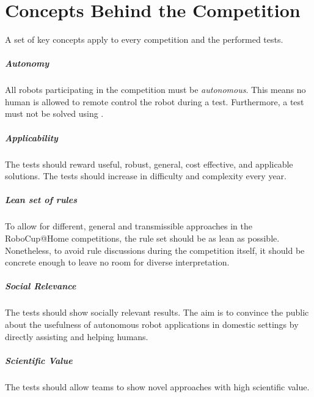 \chapter{Concepts Behind the Competition}
\label{chap:concepts}
A set of key concepts apply to every \RoboCup\AtHome{} competition and the performed tests.

\paragraph{Autonomy}
\label{sec:concepts:autonomy}
All robots participating in the \RoboCup\AtHome{} competition must be \emph{autonomous}. This means no human is allowed to remote control the robot during a test. Furthermore, a test must not be solved using \OLC{}.

\paragraph{Applicability}
\label{sec:concepts:applicability}
The tests should reward useful, robust, general, cost effective, and applicable solutions. The tests should increase in difficulty and complexity every year.

\paragraph{Lean set of rules}
\label{sec:concepts:leanrules}
To allow for different, general and transmissible approaches in the RoboCup@Home competitions, the rule set should be as lean as possible. Nonetheless, to avoid rule discussions during the competition itself, it should be concrete enough to leave no room for diverse interpretation.

\paragraph{Social Relevance}
\label{sec:concepts:socialrelevance}
The tests should show socially relevant results. The aim is to convince the public about the usefulness of autonomous robot applications in domestic settings by directly assisting and helping humans.

\paragraph{Scientific Value}
\label{sec:concepts:scientificvalue}
The tests should allow teams to show novel approaches with high scientific value.

